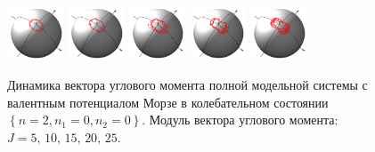 \begin{figure}[H]
  \centering
	\includegraphics[width=0.15\textwidth]{../pictures/MorseSecondState00/plot_J=5.png}
	\includegraphics[width=0.15\textwidth]{../pictures/MorseSecondState00/plot_J=10.png}
	\includegraphics[width=0.15\textwidth]{../pictures/MorseSecondState00/plot_J=15.png}
	\includegraphics[width=0.15\textwidth]{../pictures/MorseSecondState00/plot_J=20.png}
	\includegraphics[width=0.15\textwidth]{../pictures/MorseSecondState00/plot_J=25.png}
	\caption{Динамика вектора углового момента полной модельной системы с валентным потенциалом Морзе в колебательном состоянии $\left\{ n = 2, n_1 = 0, n_2 = 0 \right\}$. 
Модуль вектора углового момента: $J = 5, \, 10, \, 15, \, 20, \, 25$.}
\label{fig:morse200}
\end{figure}